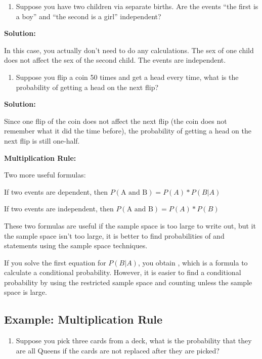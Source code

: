 \documentclass[]{book}
\providecommand{\tightlist}{%
  \setlength{\itemsep}{0pt}\setlength{\parskip}{0pt}}
\begin{document}
\begin{enumerate}
\def\labelenumi{\alph{enumi}.}
\setcounter{enumi}{4}
\tightlist
\item
  Suppose you have two children via separate births. Are the events ``the first is a boy'' and ``the second is a girl'' independent?
\end{enumerate}

\textbf{Solution:}

In this case, you actually don't need to do any calculations. The sex of one child does not affect the sex of the second child. The events are independent.

\begin{enumerate}
\def\labelenumi{\alph{enumi}.}
\setcounter{enumi}{5}
\tightlist
\item
  Suppose you flip a coin 50 times and get a head every time, what is the probability of getting a head on the next flip?
\end{enumerate}

\textbf{Solution:}

Since one flip of the coin does not affect the next flip (the coin does not remember what it did the time before), the probability of getting a head on the next flip is still one-half.

\textbf{Multiplication Rule:}

Two more useful formulas:

If two events are dependent, then \(P(\text{A and B})=P(A)*P(B|A)\)

If two events are independent, then \(P(\text{A and B})=P(A)*P(B)\)

These two formulas are useful if the sample space is too large to write out, but it the sample space isn't too large, it is better to find probabilities of and statements using the sample space techniques.

If you solve the first equation for \(P(B|A)\), you obtain , which is a formula to calculate a conditional probability. However, it is easier to find a conditional probability by using the restricted sample space and counting unless the sample space is large.

\hypertarget{example-multiplication-rule}{%
\subsection{Example: Multiplication Rule}\label{example-multiplication-rule}}

\begin{enumerate}
\def\labelenumi{\alph{enumi}.}
\tightlist
\item
  Suppose you pick three cards from a deck, what is the probability
  that they are all Queens if the cards are not replaced after they
  are picked?
\end{enumerate}
\end{document}
